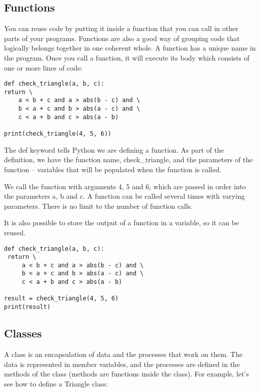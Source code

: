 \subsection{Functions}\label{functions}

You can reuse code by putting it inside a function that you can call in
other parts of your programs. Functions are also a good way of grouping
code that logically belongs together in one coherent whole. A function
has a unique name in the program. Once you call a function, it will
execute its body which consists of one or more lines of code:

\begin{verbatim}
def check_triangle(a, b, c):
return \
    a < b + c and a > abs(b - c) and \
    b < a + c and b > abs(a - c) and \
    c < a + b and c > abs(a - b)

print(check_triangle(4, 5, 6))
\end{verbatim}

The def keyword tells Python we are defining a function. As part of the
definition, we have the function name, check\_triangle, and the
parameters of the function -- variables that will be populated when the
function is called.

We call the function with arguments 4, 5 and 6, which are passed in
order into the parameters a, b and c. A function can be called several
times with varying parameters. There is no limit to the number of
function calls.

It is also possible to store the output of a function in a variable, so
it can be reused.

\begin{verbatim}
def check_triangle(a, b, c):
 return \
     a < b + c and a > abs(b - c) and \
     b < a + c and b > abs(a - c) and \
     c < a + b and c > abs(a - b)

result = check_triangle(4, 5, 6)
print(result)
\end{verbatim}

\subsection{Classes}\label{classes}

A class is an encapsulation of data and the processes that work on them.
The data is represented in member variables, and the processes are
defined in the methods of the class (methods are functions inside the
class). For example, let's see how to define a Triangle class:

